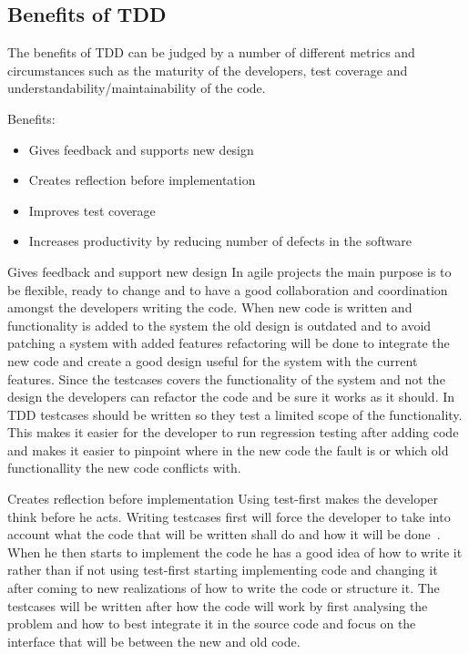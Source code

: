\subsection{Benefits of TDD} 
The benefits of TDD can be judged by a number of different metrics and circumstances such as the maturity of the developers, test coverage and understandability/maintainability of the code.

Benefits:
\begin{itemize}
\item Gives feedback and supports new design
\item Creates reflection before implementation
\item Improves test coverage
\item Increases productivity by reducing number of defects in the software
\end{itemize}

Gives feedback and support new design
In agile projects the main purpose is to be flexible, ready to change and to have a good collaboration and coordination amongst the developers writing the code. When new code is written and functionality is added to the system the old design is outdated and to avoid patching a system with added features refactoring will be done to integrate the new code and create a good design useful for the system with the current features. 
Since the testcases covers the functionality of the system and not the design the developers can refactor the code and be sure it works as it should. 
In TDD testcases should be written so they test a limited scope of the functionality. This makes it easier for the developer to run regression testing after adding code and makes it easier to pinpoint where in the new code the fault is or which old functionallity the new code conflicts with.

Creates reflection before implementation
Using test-first makes the developer think before he acts. Writing testcases first will force the developer to take into account what the code that will be written shall do and how it will be done~\cite{erdogmus}. When he then starts to implement the code he has a good idea of how to write it rather than if not using test-first starting implementing code and changing it after coming to new realizations of how to write the code or structure it. The testcases will be written after how the code will work by first analysing the problem and how to best integrate it in the source code and focus on the interface that will be between the new and old code.

